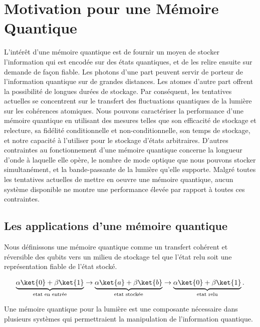 \chapter*{Motivation pour une M\'emoire Quantique}
\label{ch:1_fr} 

L'int\'er\^et d'une m\'emoire quantique est de fournir un moyen de stocker l'information qui est encod\'ee sur des \'etats quantiques, et de les relire ensuite sur demande de fa\c{c}on fiable.  Les photons d'une part peuvent servir de porteur de l'information quantique sur de grandes distances. Les atomes d'autre part offrent la possibilit\'e de longues dur\'ees de stockage. Par cons\'equent, les tentatives actuelles se concentrent sur le transfert des fluctuations quantiques de la lumi\`ere sur les coh\'erences atomiques.  Nous pouvons caract\'eriser la performance d'une m\'emoire quantique en utilisant des mesures telles que son efficacit\'e de stockage et relecture, sa fid\'elit\'e conditionnelle et non-conditionnelle, son temps de stockage, et notre capacit\'e \`a l'utiliser pour le stockage d'\'etats arbitraires.  D'autres contraintes au fonctionnement d'une m\'emoire quantique concerne la longueur d'onde \`a laquelle elle op\`ere, le nombre de mode optique que nous pouvons stocker simultan\'ement, et la bande-passante de la lumi\`ere qu'elle supporte.  Malgr\'e toutes les tentatives actuelles de mettre en oeuvre une m\'emoire quantique, aucun syst\`eme disponible ne montre une performance \'elev\'ee par rapport \`a toutes ces contraintes.



\section*{Les applications d'une m\'emoire quantique}

Nous d\'efinissons une m\'emoire quantique comme un transfert coh\'erent et r\'eversible des qubits vers un milieu de stockage tel que l'\'etat relu soit une repr\'esentation fiable de l'\'etat stock\'e.

\begin{eqnarray}
  \label{eq:qmem_fr}
  \underbrace{\alpha \ket{0} + \beta \ket{1}}_{\text{etat en entr\'ee}}  \rightarrow \underbrace{\alpha \ket{a} + \beta \ket{b}}_{\text{etat stock\'ee}} \rightarrow \underbrace{\alpha \ket{0} + \beta \ket{1}}_{\text{etat relu}}.
\end{eqnarray}

\noindent
Une m\'emoire quantique pour la lumi\`ere est une composante n\'ecessaire dans plusieurs syst\`emes qui permettraient la manipulation de l'information quantique.


